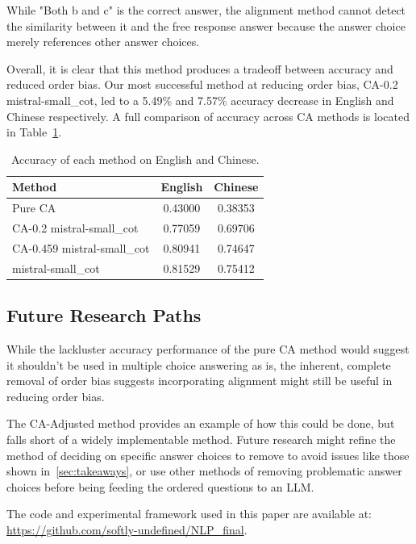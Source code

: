 While "Both b and c" is the correct answer, the alignment method cannot detect the similarity between it and the free response answer because the answer choice merely references other answer choices. 

Overall, it is clear that this method produces a tradeoff between accuracy and reduced order bias. Our most successful method at reducing order bias, CA-0.2 mistral-small\_cot, led to a 5.49\% and 7.57\% accuracy decrease in English and Chinese respectively. A full comparison of accuracy across CA methods is located in Table~\ref{tab:accuracy_results}.



\begin{table}[h]
\centering
\small
\begin{tabular}{|l|c|c|}
\hline
\textbf{Method} & \textbf{English} & \textbf{Chinese} \\
\hline
Pure CA & 0.43000 & 0.38353 \\
CA-0.2 mistral-small\_cot & 0.77059 & 0.69706 \\
CA-0.459 mistral-small\_cot & 0.80941 & 0.74647 \\
mistral-small\_cot & 0.81529 & 0.75412 \\
\hline
\end{tabular}
\caption{Accuracy of each method on English and Chinese.}
\label{tab:accuracy_results}
\end{table}


\subsection{Future Research Paths} %
While the lackluster accuracy performance of the pure CA method would suggest it shouldn't be used in multiple choice answering as is, the inherent, complete removal of order bias suggests incorporating alignment might still be useful in reducing order bias. 

The CA-Adjusted method provides an example of how this could be done, but falls short of a widely implementable method. Future research might refine the method of deciding on specific answer choices to remove to avoid issues like those shown in~\ref{sec:takeaways}, or use other methods of removing problematic answer choices before being feeding the ordered questions to an LLM.

The code and experimental framework used in this paper are available at: \url{https://github.com/softly-undefined/NLP_final}.
